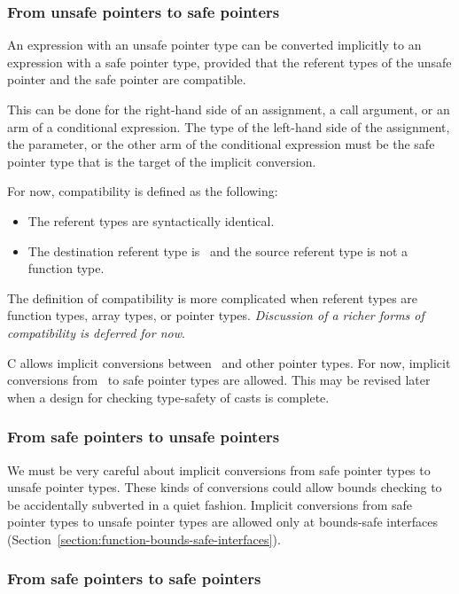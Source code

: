 \subsubsection{From unsafe pointers to safe pointers}
An expression with an unsafe pointer type can be converted implicitly to an
expression with a safe pointer type, provided that the referent types of the 
unsafe pointer and the safe pointer are compatible.

This can be done for the right-hand side of an assignment, a call argument,
or an arm of a conditional expression.
The type of the left-hand side of the assignment, the parameter, or the other 
arm of the conditional expression must be the safe pointer type that is the
target of the implicit conversion.

For now, compatibility is defined as the following:
\begin{itemize}
\item The referent types are syntactically identical.
\item The destination referent type is \void\ and the source referent type
is not a function type.
\end{itemize}
The definition of compatibility is more
complicated when referent types are function types, array types, or
pointer types. {\em Discussion of a richer forms of compatibility
is deferred for now}.

C allows implicit conversions between \unsafeptrvoid\ and other pointer
types. For now, implicit conversions from \unsafeptrvoid\ to safe pointer
types are allowed. This may be revised later when a design
for checking type-safety of casts is complete.

\subsubsection{From safe pointers to unsafe pointers}

We must be very careful about implicit conversions from safe pointer
types to unsafe pointer types.  These kinds of conversions could allow bounds checking to 
be accidentally subverted in a quiet fashion. Implicit conversions from safe pointer types to 
unsafe pointer types are allowed only at bounds-safe interfaces 
(Section~\ref{section:function-bounds-safe-interfaces}).

\subsubsection{From safe pointers to safe pointers}

